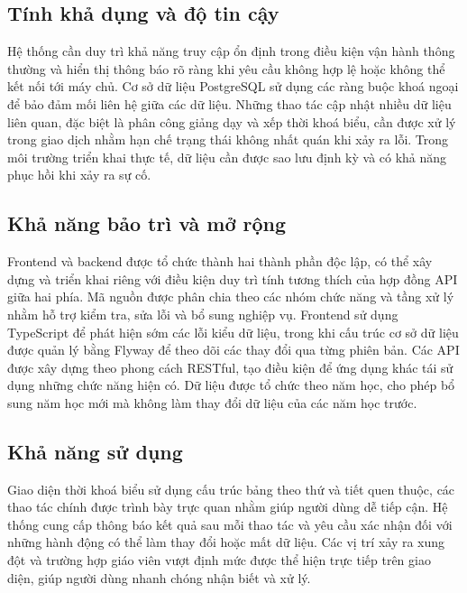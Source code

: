 \documentclass[../DoAn.tex]{subfiles}
\begin{document}
\subsection{Tính khả dụng và độ tin cậy}

Hệ thống cần duy trì khả năng truy cập ổn định trong điều kiện vận hành thông
thường và hiển thị thông báo rõ ràng khi yêu cầu không hợp lệ hoặc không thể
kết nối tới máy chủ. Cơ sở dữ liệu PostgreSQL sử dụng các ràng buộc khoá ngoại
để bảo đảm mối liên hệ giữa các dữ liệu. Những thao tác cập nhật nhiều dữ liệu
liên quan, đặc biệt là phân công giảng dạy và xếp thời khoá biểu, cần được xử lý
trong giao dịch nhằm hạn chế trạng thái không nhất quán khi xảy ra lỗi. Trong
môi trường triển khai thực tế, dữ liệu cần được sao lưu định kỳ và có khả năng
phục hồi khi xảy ra sự cố.

\subsection{Khả năng bảo trì và mở rộng}

Frontend và backend được tổ chức thành hai thành phần độc lập, có thể xây dựng
và triển khai riêng với điều kiện duy trì tính tương thích của hợp đồng API giữa
hai phía. Mã nguồn được phân chia theo các nhóm chức năng và tầng xử lý nhằm
hỗ trợ kiểm tra, sửa lỗi và bổ sung nghiệp vụ. Frontend sử dụng TypeScript để
phát hiện sớm các lỗi kiểu dữ liệu, trong khi cấu trúc cơ sở dữ liệu được quản lý
bằng Flyway để theo dõi các thay đổi qua từng phiên bản. Các API được xây dựng
theo phong cách RESTful, tạo điều kiện để ứng dụng khác tái sử dụng những chức
năng hiện có. Dữ liệu được tổ chức theo năm học, cho phép bổ sung năm học mới
mà không làm thay đổi dữ liệu của các năm học trước.

\subsection{Khả năng sử dụng}

Giao diện thời khoá biểu sử dụng cấu trúc bảng theo thứ và tiết quen thuộc, các
thao tác chính được trình bày trực quan nhằm giúp người dùng dễ tiếp cận. Hệ
thống cung cấp thông báo kết quả sau mỗi thao tác và yêu cầu xác nhận đối với
những hành động có thể làm thay đổi hoặc mất dữ liệu. Các vị trí xảy ra xung
đột và trường hợp giáo viên vượt định mức được thể hiện trực tiếp trên giao diện,
giúp người dùng nhanh chóng nhận biết và xử lý.


\end{document}
